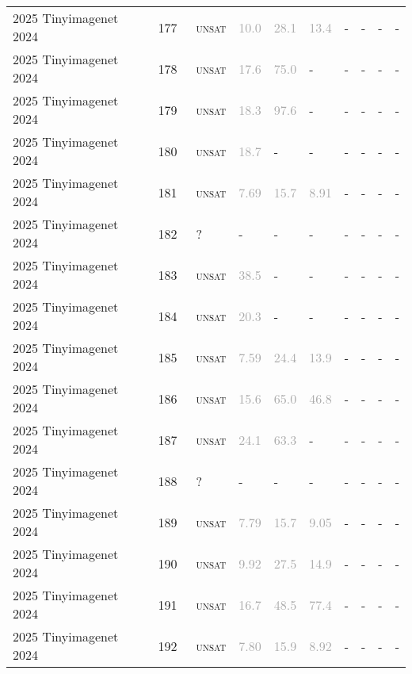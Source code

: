\begin{center}
{\begin{longtable}{@{}llllllllll@{}}
2025 Tinyimagenet 2024 & 177 & ~\textsc{unsat} & \textcolor{darkgray}{10.0} & \textcolor{darkgray}{28.1} & \textcolor{darkgray}{13.4} & - & - & - & - \\
2025 Tinyimagenet 2024 & 178 & ~\textsc{unsat} & \textcolor{darkgray}{17.6} & \textcolor{darkgray}{75.0} & - & - & - & - & - \\
2025 Tinyimagenet 2024 & 179 & ~\textsc{unsat} & \textcolor{darkgray}{18.3} & \textcolor{darkgray}{97.6} & - & - & - & - & - \\
2025 Tinyimagenet 2024 & 180 & ~\textsc{unsat} & \textcolor{darkgray}{18.7} & - & - & - & - & - & - \\
2025 Tinyimagenet 2024 & 181 & ~\textsc{unsat} & \textcolor{darkgray}{7.69} & \textcolor{darkgray}{15.7} & \textcolor{darkgray}{8.91} & - & - & - & - \\
2025 Tinyimagenet 2024 & 182 & ~? & - & - & - & - & - & - & - \\
2025 Tinyimagenet 2024 & 183 & ~\textsc{unsat} & \textcolor{darkgray}{38.5} & - & - & - & - & - & - \\
2025 Tinyimagenet 2024 & 184 & ~\textsc{unsat} & \textcolor{darkgray}{20.3} & - & - & - & - & - & - \\
2025 Tinyimagenet 2024 & 185 & ~\textsc{unsat} & \textcolor{darkgray}{7.59} & \textcolor{darkgray}{24.4} & \textcolor{darkgray}{13.9} & - & - & - & - \\
2025 Tinyimagenet 2024 & 186 & ~\textsc{unsat} & \textcolor{darkgray}{15.6} & \textcolor{darkgray}{65.0} & \textcolor{darkgray}{46.8} & - & - & - & - \\
2025 Tinyimagenet 2024 & 187 & ~\textsc{unsat} & \textcolor{darkgray}{24.1} & \textcolor{darkgray}{63.3} & - & - & - & - & - \\
2025 Tinyimagenet 2024 & 188 & ~? & - & - & - & - & - & - & - \\
2025 Tinyimagenet 2024 & 189 & ~\textsc{unsat} & \textcolor{darkgray}{7.79} & \textcolor{darkgray}{15.7} & \textcolor{darkgray}{9.05} & - & - & - & - \\
2025 Tinyimagenet 2024 & 190 & ~\textsc{unsat} & \textcolor{darkgray}{9.92} & \textcolor{darkgray}{27.5} & \textcolor{darkgray}{14.9} & - & - & - & - \\
2025 Tinyimagenet 2024 & 191 & ~\textsc{unsat} & \textcolor{darkgray}{16.7} & \textcolor{darkgray}{48.5} & \textcolor{darkgray}{77.4} & - & - & - & - \\
2025 Tinyimagenet 2024 & 192 & ~\textsc{unsat} & \textcolor{darkgray}{7.80} & \textcolor{darkgray}{15.9} & \textcolor{darkgray}{8.92} & - & - & - & - \\

\end{longtable}}
\end{center}
